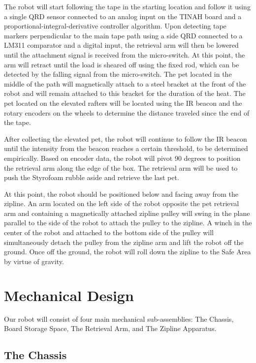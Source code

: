\documentclass[11pt, oneside]{article} %
\begin{document}
The robot will start following the tape in the starting location and follow it using a single QRD sensor connected to an analog input on the TINAH board and a proportional-integral-derivative controller algorithm. Upon detecting tape markers perpendicular to the main tape path using a side QRD connected to a LM311 comparator and a digital input, the retrieval arm will then be lowered until the attachment signal is received from the micro-switch. At this point, the arm will retract until the load is sheared off using the fixed rod, which can be detected by the falling signal from the micro-switch. The pet located in the middle of the path will magnetically attach to a steel bracket at the front of the robot and will remain attached to this bracket for the duration of the heat. The pet located on the elevated rafters will be located using the IR beacon and the rotary encoders on the wheels to determine the distance traveled since the end of the tape.

After collecting the elevated pet, the robot will continue to follow the IR beacon until the intensity from the beacon reaches a certain threshold, to be determined empirically. Based on encoder data, the robot will pivot 90 degrees to position the retrieval arm along the edge of the box. The retrieval arm will be used to push the Styrofoam rubble aside and retrieve the last pet.

At this point, the robot should be positioned below and facing away from the zipline. An arm located on the left side of the robot opposite the pet retrieval arm and containing a magnetically attached zipline pulley will swing in the plane parallel to the side of the robot to attach the pulley to the zipline. A winch in the center of the robot and attached to the bottom side of the pulley will simultaneously detach the pulley from the zipline arm and lift the robot off the ground. Once off the ground, the robot will roll down the zipline to the Safe Area by virtue of gravity.

\section{Mechanical Design}

Our robot will consist of four main mechanical sub-assemblies: The Chassis, Board Storage Space, The Retrieval Arm, and The Zipline Apparatus.

	\subsection{The Chassis}
\end{document}
